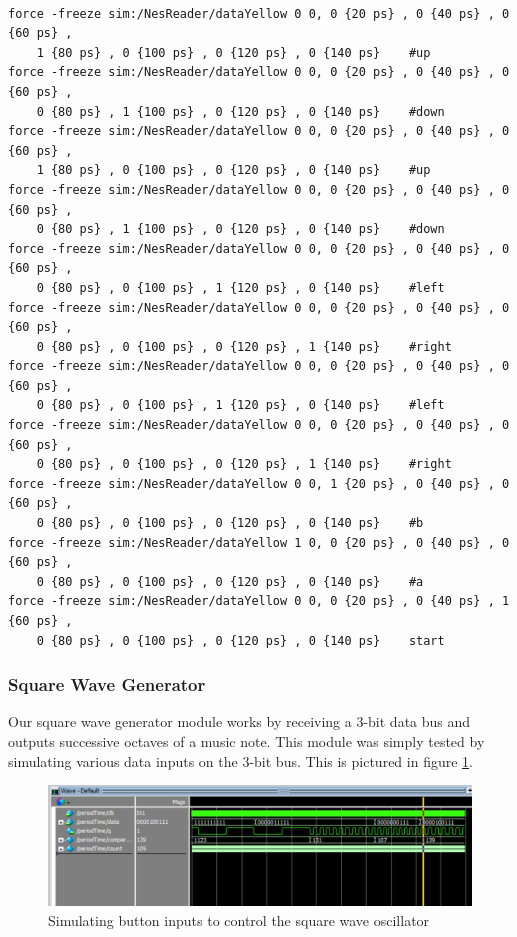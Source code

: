 \documentclass[a4paper]{article}
\begin{document}
\begin{verbatim}

force -freeze sim:/NesReader/dataYellow 0 0, 0 {20 ps} , 0 {40 ps} , 0 {60 ps} , 
    1 {80 ps} , 0 {100 ps} , 0 {120 ps} , 0 {140 ps}	#up
force -freeze sim:/NesReader/dataYellow 0 0, 0 {20 ps} , 0 {40 ps} , 0 {60 ps} , 
    0 {80 ps} , 1 {100 ps} , 0 {120 ps} , 0 {140 ps}	#down
force -freeze sim:/NesReader/dataYellow 0 0, 0 {20 ps} , 0 {40 ps} , 0 {60 ps} , 
    1 {80 ps} , 0 {100 ps} , 0 {120 ps} , 0 {140 ps}	#up
force -freeze sim:/NesReader/dataYellow 0 0, 0 {20 ps} , 0 {40 ps} , 0 {60 ps} , 
    0 {80 ps} , 1 {100 ps} , 0 {120 ps} , 0 {140 ps}	#down
force -freeze sim:/NesReader/dataYellow 0 0, 0 {20 ps} , 0 {40 ps} , 0 {60 ps} , 
    0 {80 ps} , 0 {100 ps} , 1 {120 ps} , 0 {140 ps}	#left
force -freeze sim:/NesReader/dataYellow 0 0, 0 {20 ps} , 0 {40 ps} , 0 {60 ps} , 
    0 {80 ps} , 0 {100 ps} , 0 {120 ps} , 1 {140 ps}	#right
force -freeze sim:/NesReader/dataYellow 0 0, 0 {20 ps} , 0 {40 ps} , 0 {60 ps} , 
    0 {80 ps} , 0 {100 ps} , 1 {120 ps} , 0 {140 ps}	#left
force -freeze sim:/NesReader/dataYellow 0 0, 0 {20 ps} , 0 {40 ps} , 0 {60 ps} , 
    0 {80 ps} , 0 {100 ps} , 0 {120 ps} , 1 {140 ps}	#right
force -freeze sim:/NesReader/dataYellow 0 0, 1 {20 ps} , 0 {40 ps} , 0 {60 ps} , 
    0 {80 ps} , 0 {100 ps} , 0 {120 ps} , 0 {140 ps}	#b	
force -freeze sim:/NesReader/dataYellow 1 0, 0 {20 ps} , 0 {40 ps} , 0 {60 ps} , 
    0 {80 ps} , 0 {100 ps} , 0 {120 ps} , 0 {140 ps}	#a
force -freeze sim:/NesReader/dataYellow 0 0, 0 {20 ps} , 0 {40 ps} , 1 {60 ps} , 
    0 {80 ps} , 0 {100 ps} , 0 {120 ps} , 0 {140 ps}	start
\end{verbatim}

\subsubsection{Square Wave Generator}

Our square wave generator module works by receiving a 3-bit data bus and outputs successive octaves of a music note. This module was simply tested by simulating various data inputs on the 3-bit bus. This is pictured in figure \ref{squareSim}.

\begin{figure}[H]
    \includegraphics[width=0.8 \linewidth]{images/squareSim.png}
    \caption{Simulating button inputs to control the square wave oscillator}
    \label{squareSim}
\end{figure}
\end{document}
